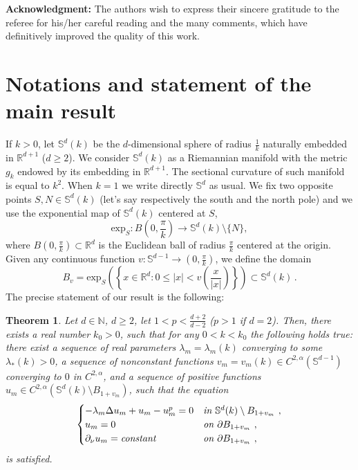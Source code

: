 \documentclass[reqno]{amsart}
\newtheorem{theorem}{Theorem}[section]
\def\R{\mathbb R}
\def\Sk{\mathbb{S}^{d}(k)}
\numberwithin{equation}{section}
\newenvironment{key words}{\textbf{Keywords}\mbox{  }}{ }
\begin{document}
\bigskip

{\bf Acknowledgment:} The authors wish to express their sincere gratitude to the referee for his/her careful reading and the many comments, which have definitively improved the quality of this work.


\section{Notations and statement of the main result}
\label{Section 2}

If $k>0$, let $\mathbb{S}^{d}(k)$ be the $d$-dimensional sphere of radius $\frac{1}{k}$ naturally embedded in $\mathbb{R}^{d+1}$ ($d\ge2$). We consider $\mathbb{S}^{d}(k)$ as a Riemannian manifold with the metric $g_k$ endowed by its embedding in $\mathbb{R}^{d+1}$. The sectional curvature of such manifold is equal to $k^{2}$.
When $k=1$ we write directly $\mathbb{S}^{d}$ as usual. We fix two opposite points $S,N \in \mathbb{S}^{d}(k)$ (let's say respectively the south and the north pole) and we use the exponential map of $\mathbb{S}^{d}(k)$ centered at $S$,
$$\mbox{exp}_S: B\left(0, \frac{\pi}{k}\right) \to \Sk \setminus\{N\},$$
where $B\left(0, \frac{\pi}{k}\right) \subset \R^d$ is the Euclidean ball of radius $\frac{\pi}{k}$ centered at the origin.
Given any continuous function $v: \mathbb{S}^{d-1} \to \left(0, \frac{\pi}{k}\right)$, we define the domain
\[  B_v = \mbox{exp}_S \left (  \left\{x\in\mathbb{R}^{d}:0\leq|x|<v\left(\frac{x}{|x|}\right)\right\} \right )\subset \Sk\,.
\]
The precise statement of our result is the following:

\begin{theorem} \label{Th11}
	Let $d\in\mathbb{N}$, $d\geq2$, let $1<p<\frac{d+2}{d-2}$ ($p>1$ if $d=2$). Then, there exists a real number $k_{0}>0$, such that for any $0<k<k_{0}$ the following holds true: there exist a sequence of real parameters $\lambda_{m} = \lambda_m(k)$ converging to some $\lambda_*(k) >0$, a sequence of nonconstant functions $v_{m} = v_m (k)\in C^{2,\alpha}(\mathbb{S}^{d-1})$ converging to $0$ in $C^{2,\alpha}$, and a sequence of positive functions $u_m\in C^{2,\alpha}(\mathbb{S}^{d}(k)\setminus B_{1+v_{m}})$, such that the equation
	\begin{gather}\label{eq102}
		\begin{cases}
			-\lambda_{m}\Delta u_m +u_m-u_m^{p} =0&\emph{in $\mathbb{S}^{d}(k)\setminus B_{1+v_{m}}$ }, \\
			u_m=0 &\emph{on $\partial B_{1+v_{m}}$ },\\
			\partial_{\nu} u_m=\emph{constant} &\emph{on $\partial B_{1+v_{m}}$ },
		\end{cases}
	\end{gather}
is satisfied.
\end{theorem}
\end{document}
